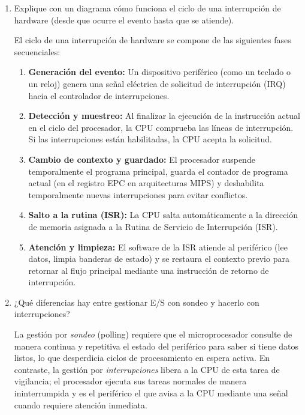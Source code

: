 \documentclass[12pt,a4paper]{article}
\begin{document}
\begin{enumerate}[label=\arabic*.]

    \item Explique con un diagrama cómo funciona el ciclo de una interrupción de hardware (desde que ocurre el evento hasta que se atiende).

    \vspace{0.3cm}
    \noindent
    El ciclo de una interrupción de hardware se compone de las siguientes fases secuenciales:
    \begin{enumerate}
        \item \textbf{Generación del evento:} Un dispositivo periférico (como un teclado o un reloj) genera una señal eléctrica de solicitud de interrupción (IRQ) hacia el controlador de interrupciones.
        \item \textbf{Detección y muestreo:} Al finalizar la ejecución de la instrucción actual en el ciclo del procesador, la CPU comprueba las líneas de interrupción. Si las interrupciones están habilitadas, la CPU acepta la solicitud.
        \item \textbf{Cambio de contexto y guardado:} El procesador suspende temporalmente el programa principal, guarda el contador de programa actual (en el registro EPC en arquitecturas MIPS) y deshabilita temporalmente nuevas interrupciones para evitar conflictos.
        \item \textbf{Salto a la rutina (ISR):} La CPU salta automáticamente a la dirección de memoria asignada a la Rutina de Servicio de Interrupción (ISR).
        \item \textbf{Atención y limpieza:} El software de la ISR atiende al periférico (lee datos, limpia banderas de estado) y se restaura el contexto previo para retornar al flujo principal mediante una instrucción de retorno de interrupción.
    \end{enumerate}

    \item ¿Qué diferencias hay entre gestionar E/S con sondeo y hacerlo con interrupciones?

    \vspace{0.3cm}
    \noindent
    La gestión por \textit{sondeo} (polling) requiere que el microprocesador consulte de manera continua y repetitiva el estado del periférico para saber si tiene datos listos, lo que desperdicia ciclos de procesamiento en espera activa. En contraste, la gestión por \textit{interrupciones} libera a la CPU de esta tarea de vigilancia; el procesador ejecuta sus tareas normales de manera ininterrumpida y es el periférico el que avisa a la CPU mediante una señal cuando requiere atención inmediata.


\end{enumerate}
\end{document}
